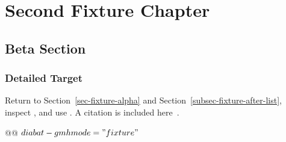 \chapter{Second Fixture Chapter}\label{chap-fixture-two}
\section{Beta Section}\label{sec-fixture-beta}
\subsection{Detailed Target}\label{subsec-fixture-detail}
Return to Section~\ref{sec-fixture-alpha} and
Section~\ref{subsec-fixture-after-list}, inspect
, and use
. A citation is included here~\cite{Fixture2026}.

\begin{lst-script}[escapechar=@]
@@
$diabat-gmh
  mode = "fixture"
$
\end{lst-script}
